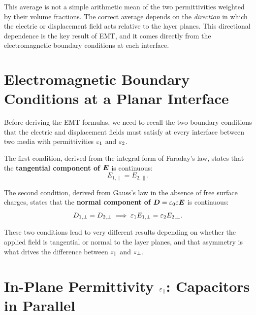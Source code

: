 This average is not a simple arithmetic mean of the two permittivities weighted
by their volume fractions. The correct average depends on the \emph{direction}
in which the electric or displacement field acts relative to the layer planes.
This directional dependence is the key result of EMT, and it comes directly from
the electromagnetic boundary conditions at each interface.

\section{Electromagnetic Boundary Conditions at a Planar Interface}

Before deriving the EMT formulas, we need to recall the two boundary conditions
that the electric and displacement fields must satisfy at every interface between
two media with permittivities $\varepsilon_1$ and $\varepsilon_2$.

The first condition, derived from the integral form of Faraday's law, states
that the \textbf{tangential component of $\bm{E}$} is continuous:
\begin{equation}
  E_{1,\parallel} = E_{2,\parallel}.
  \label{eq:ch3_E_tangential}
\end{equation}

The second condition, derived from Gauss's law in the absence of free surface
charges, states that the \textbf{normal component of $\bm{D} = \varepsilon_0\varepsilon\bm{E}$}
is continuous:
\begin{equation}
  D_{1,\perp} = D_{2,\perp} \implies
  \varepsilon_1 E_{1,\perp} = \varepsilon_2 E_{2,\perp}.
  \label{eq:ch3_D_normal}
\end{equation}

These two conditions lead to very different results depending on whether the
applied field is tangential or normal to the layer planes, and that asymmetry
is what drives the difference between $\varepsilon_{\parallel}$ and $\varepsilon_{\perp}$.

\section{In-Plane Permittivity \texorpdfstring{$\varepsilon_{\parallel}$}{eps\_par}:
         Capacitors in Parallel}

